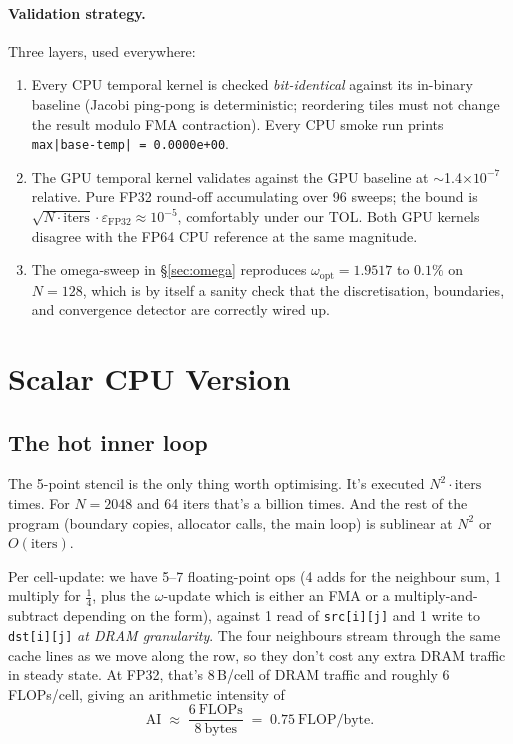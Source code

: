 \documentclass[11pt]{article}
\begin{document}
\paragraph{Validation strategy.}  Three layers, used everywhere:
\begin{enumerate}[leftmargin=1.4em,itemsep=2pt,topsep=2pt]
  \item Every CPU temporal kernel is checked \emph{bit-identical}
        against its in-binary baseline (Jacobi ping-pong is
        deterministic; reordering tiles must not change the result
        modulo FMA contraction).  Every CPU smoke run prints
        \texttt{max|base-temp| = 0.0000e+00}.
  \item The GPU temporal kernel validates against the GPU baseline at
        $\sim$1.4$\times 10^{-7}$ relative. Pure FP32 round-off
        accumulating over 96 sweeps; the bound is $\sqrt{N\cdot
        \text{iters}}\cdot\varepsilon_{\text{FP32}} \approx 10^{-5}$,
        comfortably under our TOL.  Both GPU kernels disagree with
        the FP64 CPU reference at the same magnitude.
  \item The omega-sweep in §\ref{sec:omega} reproduces
        $\omega_{\text{opt}} = 1.9517$ to $0.1\%$ on $N{=}128$, which
        is by itself a sanity check that the discretisation,
        boundaries, and convergence detector are correctly wired up.
\end{enumerate}

\section{Scalar CPU Version}
\label{sec:cpu}

\subsection{The hot inner loop}

The 5-point stencil is the only thing worth optimising.  It's
executed $N^2 \cdot \text{iters}$ times. For $N{=}2048$ and 64 iters
that's a billion times. And the rest of the program (boundary
copies, allocator calls, the main loop) is sublinear at $N^2$ or
$O(\text{iters})$.

Per cell-update: we have 5--7 floating-point ops (4 adds for the
neighbour sum, 1 multiply for $\tfrac{1}{4}$, plus the
$\omega$-update which is either an FMA or a multiply-and-subtract
depending on the form), against 1 read of \texttt{src[i][j]} and
1 write to \texttt{dst[i][j]} \emph{at DRAM granularity}. The four
neighbours stream through the same cache lines as we move along the
row, so they don't cost any extra DRAM traffic in steady state.  At
FP32, that's 8\,B/cell of DRAM traffic and roughly 6\,FLOPs/cell,
giving an arithmetic intensity of
\begin{equation}
\text{AI} \;\approx\; \frac{6~\text{FLOPs}}{8~\text{bytes}}
\;=\; 0.75~\text{FLOP/byte}.
\label{eq:ai}
\end{equation}
\end{document}
